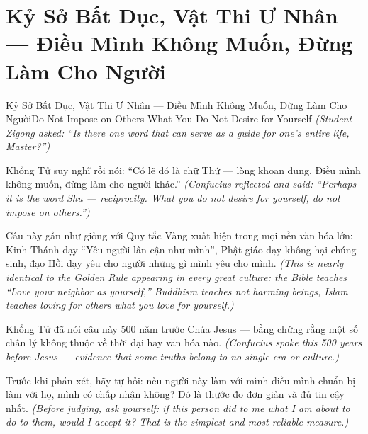 \section{Kỷ Sở Bất Dục, Vật Thi Ư Nhân — Điều Mình Không Muốn, Đừng Làm Cho Người}
\begin{truyen}{Kỷ Sở Bất Dục, Vật Thi Ư Nhân — Điều Mình Không Muốn, Đừng Làm Cho Người}{Do Not Impose on Others What You Do Not Desire for Yourself}
\textit{(Student Zigong asked: ``Is there one word that can serve as a guide for one's entire life, Master?'')}

Khổng Tử suy nghĩ rồi nói: ``Có lẽ đó là chữ Thứ — lòng khoan dung. Điều mình không muốn, đừng làm cho người khác.''
\textit{(Confucius reflected and said: ``Perhaps it is the word Shu — reciprocity. What you do not desire for yourself, do not impose on others.'')}

Câu này gần như giống với Quy tắc Vàng xuất hiện trong mọi nền văn hóa lớn: Kinh Thánh dạy ``Yêu người lân cận như mình'', Phật giáo dạy không hại chúng sinh, đạo Hồi dạy yêu cho người những gì mình yêu cho mình.
\textit{(This is nearly identical to the Golden Rule appearing in every great culture: the Bible teaches ``Love your neighbor as yourself,'' Buddhism teaches not harming beings, Islam teaches loving for others what you love for yourself.)}

Khổng Tử đã nói câu này 500 năm trước Chúa Jesus — bằng chứng rằng một số chân lý không thuộc về thời đại hay văn hóa nào.
\textit{(Confucius spoke this 500 years before Jesus — evidence that some truths belong to no single era or culture.)}

\end{truyen}

\begin{baihoc}
Trước khi phán xét, hãy tự hỏi: nếu người này làm với mình điều mình chuẩn bị làm với họ, mình có chấp nhận không? Đó là thước đo đơn giản và đủ tin cậy nhất.
\textit{(Before judging, ask yourself: if this person did to me what I am about to do to them, would I accept it? That is the simplest and most reliable measure.)}
\end{baihoc}
\ngancach

